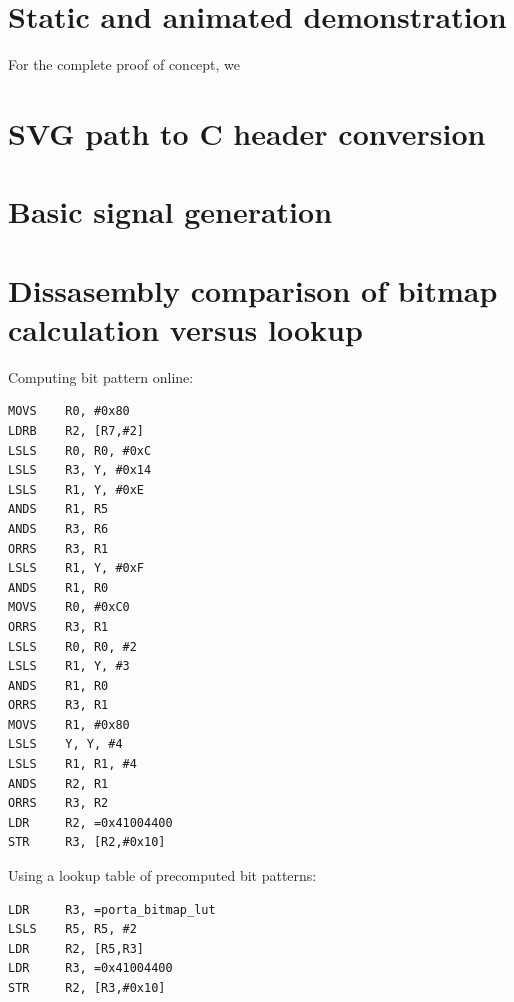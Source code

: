 \documentclass[12pt]{article}
\begin{document}
\section{Static and animated demonstration}

For the complete proof of concept, we 

\newpage
\begin{appendices}
\section{SVG path to C header conversion}
\label{appendix:svg2header}


\newpage
\section{Basic signal generation}
\label{appendix:staticvector}


\newpage
\section{Dissasembly comparison of bitmap calculation versus lookup}
\label{appendix:lutoptimisation}

\begin{multicols}{2}

\noindent Computing bit pattern online:
\begin{lstlisting}
MOVS    R0, #0x80
LDRB    R2, [R7,#2]
LSLS    R0, R0, #0xC
LSLS    R3, Y, #0x14
LSLS    R1, Y, #0xE
ANDS    R1, R5
ANDS    R3, R6
ORRS    R3, R1
LSLS    R1, Y, #0xF
ANDS    R1, R0
MOVS    R0, #0xC0
ORRS    R3, R1
LSLS    R0, R0, #2
LSLS    R1, Y, #3
ANDS    R1, R0
ORRS    R3, R1
MOVS    R1, #0x80
LSLS    Y, Y, #4
LSLS    R1, R1, #4
ANDS    R2, R1
ORRS    R3, R2
LDR     R2, =0x41004400
STR     R3, [R2,#0x10]
\end{lstlisting}

\columnbreak
\noindent Using a lookup table of precomputed bit patterns:

\begin{lstlisting}
LDR     R3, =porta_bitmap_lut
LSLS    R5, R5, #2
LDR     R2, [R5,R3]
LDR     R3, =0x41004400
STR     R2, [R3,#0x10]
\end{lstlisting}

\end{multicols}

\end{appendices}
\end{document}
